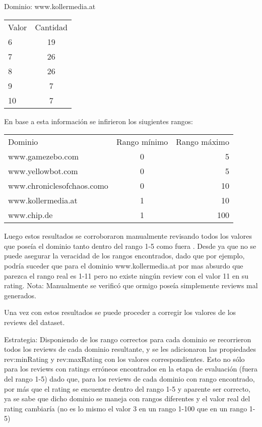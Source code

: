 Dominio: www.kollermedia.at\\
\begin{tabular}{| l | c |}
 Valor & Cantidad\\
 6 & 19\\
 7 & 26\\
 8 & 26\\
 9 & 7\\
 10 & 7\\
\end{tabular}
 
En base a esta información se infirieron los siugientes rangos:

\begin{tabular}{| l | c | r | }
 Dominio & Rango mínimo & Rango máximo \\
 www.gamezebo.com & 0 & 5 \\
 www.yellowbot.com & 0 & 5 \\
 www.chroniclesofchaos.como & 0 & 10 \\
 www.kollermedia.at & 1 & 10 \\
 www.chip.de & 1 & 100 
\end{tabular}

Luego estos resultados se corroboraron manualmente revisando todos los valores que poseía el dominio tanto dentro del rango 1-5 como fuera .
Desde ya que no se puede asegurar la veracidad de los rangos encontrados, dado que por ejemplo, podría suceder que para el dominio 
www.kollermedia.at por mas absurdo que parezca el rango real es 1-11 pero no existe ningún review con el valor 11 en su rating.
Nota: Manualmente se verificó que ormigo poseía simplemente reviews mal generados.

Una vez con estos resultados se puede proceder a corregir los valores de los reviews del dataset.

Estrategia:
Disponiendo de los rango correctos para cada dominio se recorrieron todos los reviews de cada dominio resultante, y se les adicionaron 
las propiedades rev:minRating y rev:maxRating con los valores correspondientes.
Esto no sólo para los reviews con ratings erróneos encontrados en la etapa de evaluación (fuera del rango 1-5) dado que, para los reviews de 
cada dominio con rango encontrado, por más que el rating se encuentre dentro del rango 1-5 y aparente ser correcto,  ya se sabe que dicho dominio se 
maneja con rangos diferentes y el valor real del rating cambiaría (no es lo mismo el valor 3 en un rango 1-100 que en un rango 1-5)

